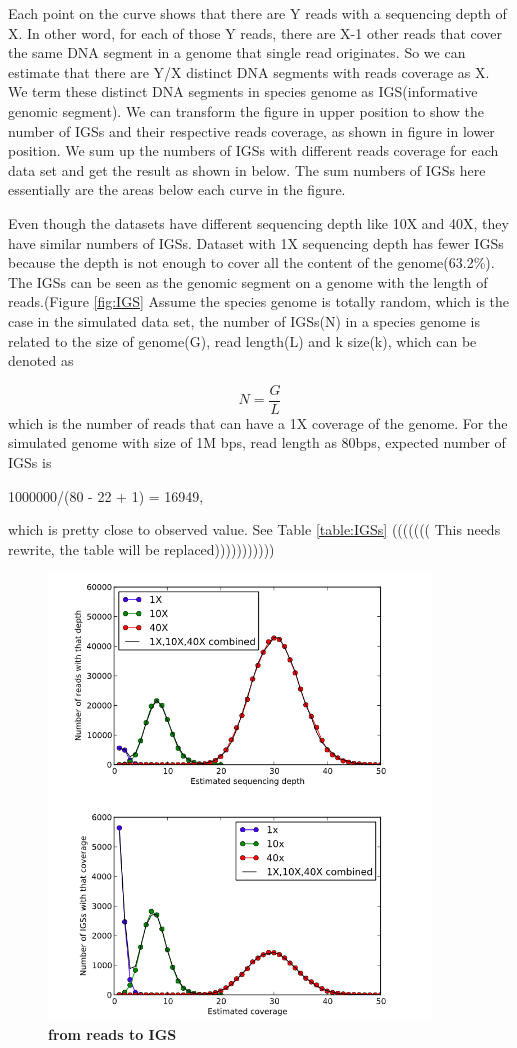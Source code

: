 \documentclass[12pt]{report}
\begin{document}
Each point on the curve shows that there are Y reads with a sequencing depth of
 X. In other word, for each of those Y reads, there are X-1 other reads that 
cover the same DNA segment in a genome that single read originates. So we can 
estimate that there are Y/X distinct DNA segments with reads coverage as X. 
We term these distinct DNA segments in species genome as 
IGS(informative genomic segment). We can transform the figure in upper 
position to show the number of IGSs and their respective reads coverage, as 
shown in figure in lower position. We sum up the numbers of IGSs with 
different reads coverage for each data set and get the result as shown in 
below. The sum numbers of IGSs here essentially are the areas below each curve 
in the figure.

Even though the datasets have different sequencing depth like 10X and 40X, 
they have similar numbers of IGSs. Dataset with 1X sequencing depth has fewer 
IGSs because the depth is not enough to cover all the content of the 
genome(63.2\%). The IGSs can be seen as the
genomic segment on a genome with the length of reads.(Figure \ref{fig:IGS}  
Assume the species 
genome is totally random, which is the case in the simulated data set, the 
number of IGSs(N) in a species genome is related to the size of genome(G), 
read length(L) and k size(k), which can be denoted as

\[N =\frac{G}{L}  \]
which is the number of reads that can have a 1X coverage of the genome.
For the simulated genome with size of 1M bps, read length as 80bps, expected 
number of IGSs is 

1000000/(80 - 22 + 1) = 16949, 

which is pretty close to observed value. See Table \ref{table:IGSs}
((((((( This needs rewrite, the table will be replaced)))))))))))

\begin{figure}[!ht]
\centerline{\includegraphics[width=4in]{./figures/from_reads_to_IGS.png}}
\caption{\bf from reads to IGS}
\label{fig:reads_to_IGS}
\end{figure}
\end{document}
